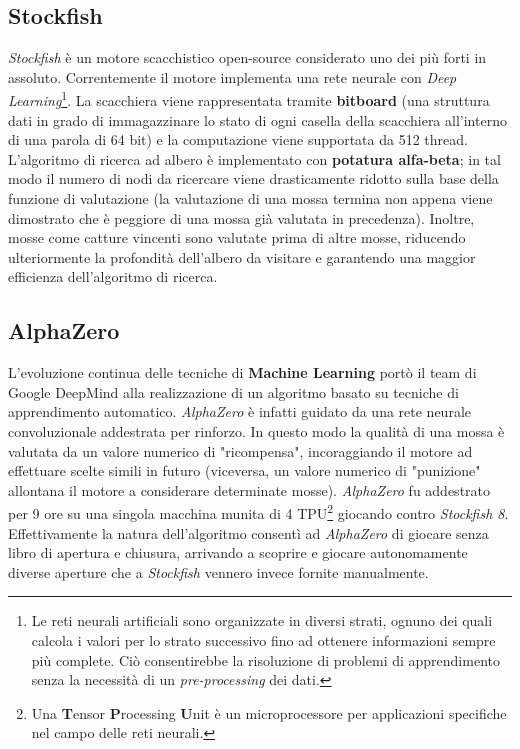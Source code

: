 \subsection{Stockfish}
\textit{Stockfish} è un motore scacchistico open-source considerato uno dei più forti in assoluto. Correntemente il motore implementa una rete neurale con \textit{Deep Learning}\footnote{Le reti neurali artificiali sono organizzate in diversi strati, ognuno dei quali calcola i valori per lo strato successivo fino ad ottenere informazioni sempre più complete. Ciò consentirebbe la risoluzione di problemi di apprendimento senza la necessità di un \textit{pre-processing} dei dati.}. La scacchiera viene rappresentata tramite \textbf{bitboard} (una struttura dati in grado di immagazzinare lo stato di ogni casella della scacchiera all’interno di una parola di 64 bit) e la computazione viene supportata da 512 thread. L'algoritmo di ricerca ad albero è implementato con \textbf{potatura alfa-beta}; in tal modo il numero di nodi da ricercare viene drasticamente ridotto sulla base della funzione di valutazione (la valutazione di una mossa termina non appena viene dimostrato che è peggiore di una mossa già valutata in precedenza). Inoltre, mosse come catture vincenti sono valutate prima di altre mosse, riducendo ulteriormente la profondità dell'albero da visitare e garantendo una maggior efficienza dell'algoritmo di ricerca\cite{enwiki:1105171756}.

\subsection{AlphaZero}
L'evoluzione continua delle tecniche di \textbf{Machine Learning} portò il team di Google DeepMind alla realizzazione di un algoritmo basato su tecniche di apprendimento automatico. \textit{AlphaZero} è infatti guidato da una rete neurale convoluzionale addestrata per rinforzo. In questo modo la qualità di una mossa è valutata da un valore numerico di "ricompensa", incoraggiando il motore ad effettuare scelte simili in futuro (viceversa, un valore numerico di "punizione" allontana il motore a considerare determinate mosse). \textit{AlphaZero} fu addestrato per 9 ore su una singola macchina munita di 4 TPU\footnote{Una \textbf{T}ensor \textbf{P}rocessing \textbf{U}nit è un microprocessore per applicazioni specifiche nel campo delle reti neurali.} giocando contro \textit{Stockfish 8}. Effettivamente la natura dell'algoritmo consentì ad \textit{AlphaZero} di giocare senza libro di apertura e chiusura, arrivando a scoprire e giocare autonomamente diverse aperture che a \textit{Stockfish} vennero invece fornite manualmente\cite{silver2018general}.





\newpage
